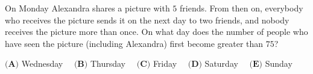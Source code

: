 On Monday Alexandra shares a picture with $5$ friends. From then on, everybody who receives the picture sends it on the next day to two friends, and nobody receives the picture more than once. On what day does the number of people who have seen the picture (including Alexandra) first become greater than $75$?

$\textbf{(A)}$ Wednesday $\quad\textbf{(B)}$ Thursday $\quad\textbf{(C)}$ Friday $\quad\textbf{(D)}$ Saturday $\quad\textbf{(E)}$ Sunday
